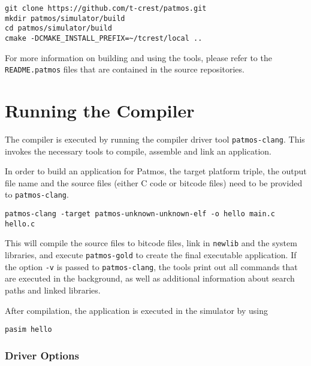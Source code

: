 \begin{verbatim}
git clone https://github.com/t-crest/patmos.git
mkdir patmos/simulator/build
cd patmos/simulator/build
cmake -DCMAKE_INSTALL_PREFIX=~/tcrest/local ..
\end{verbatim}


For more information on building and using the tools, please refer to the \texttt{README.patmos} files 
that are contained in the source repositories.


\section{Running the Compiler}


The compiler is executed by running the compiler driver tool \texttt{patmos-clang}. This invokes the 
necessary tools to compile, assemble and link an application. 

In order to build an application for Patmos, the target platform triple, the output file name and the source files (either C code or bitcode files) 
need to be provided to \texttt{patmos-clang}.

\begin{verbatim}
patmos-clang -target patmos-unknown-unknown-elf -o hello main.c hello.c
\end{verbatim}

This will compile the source files to bitcode files, link in \texttt{newlib} and the system libraries,
and execute \texttt{patmos-gold} to create the final executable application. If the option \texttt{-v} is passed
to \texttt{patmos-clang}, the tools print out all commands that are executed in the background, as well as additional information
about search paths and linked libraries.

After compilation, the application is executed in the simulator by using

\begin{verbatim}
pasim hello
\end{verbatim}

\subsubsection{Driver Options}

